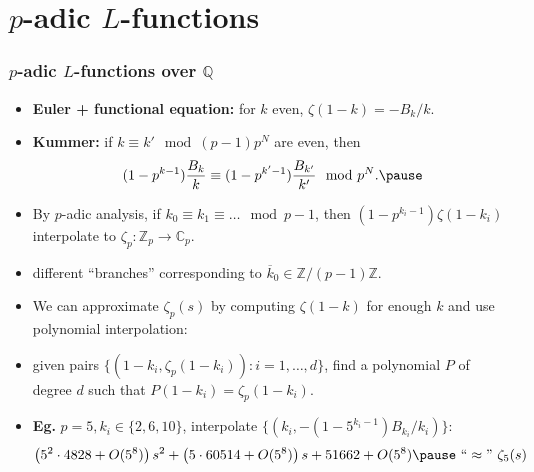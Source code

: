 \documentclass[10pt]{beamer}
\newcommand{\Z}{\mathbb{Z}}
\newcommand{\Q}{\mathbb{Q}}
\newcommand{\C}{\mathbb{C}}
\renewcommand{\bar}{\overline}
\begin{document}
\section{$p$-adic $L$-functions}
\begin{frame}
  \frametitle{$p$-adic $L$-functions over $\Q$}
\begin{itemize}\pause

\item \textbf{Euler + functional equation:} for $k$ even, $\zeta(1-k) = -B_{k}/k$.\pause
\item \textbf{Kummer:} if $k \equiv k' \mod{(p-1)p^{N}}$ are even, then
  \[   (1-p^{k-1})\frac{B_{k}}{k} \equiv (1-p^{k'-1})\frac{B_{k'}}{k'} \mod{p^{N}}.\pause
  \]
\vspace{-5pt}
\item By $p$-adic analysis, if
  $k_{0}\equiv k_{1}\equiv \ldots \mod{p-1}$, then $(1-p^{k_{i}-1})\zeta(1-k_{i})$ interpolate to
  $\zeta_{p}\colon \Z_{p}\to \C_{p}$. \pause
\item different ``branches'' corresponding to $\bar k_{0} \in \Z/(p-1)\Z$.\pause
\item We can approximate $\zeta_{p}(s)$ by computing $\zeta(1-k)$ for
  enough $k$ and use polynomial interpolation: \pause

\item given pairs
  $\{(1-k_{i},\zeta_{p}(1-k_{i})) : i = 1,\ldots, d\}$, find a polynomial
  $P$ of degree $d$ such that $P(1-k_{i}) = \zeta_{p}(1-k_{i})$. \pause
\item \textbf{Eg.} $p=5, k_{i}\in \{2,6,10\}$, interpolate $\{(k_{i},-(1-5^{k_{i}-1})B_{k_{i}}/k_{i})\}$: \pause
  \[\left(5^{2} \cdot 4828 + O(5^{8})\right) s^{2} + \left(5 \cdot 60514 + O(5^{8})\right) s + 51662 + O(5^{8})\pause \ ``\approx"  \ \zeta_{5}(s)
  \]
\end{itemize}

\end{frame}
\end{document}
